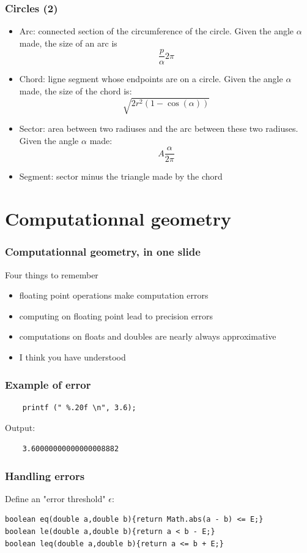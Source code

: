 \documentclass[pdf]{beamer}
\begin{document}
\begin{frame}
	\frametitle{Circles (2)}
	\begin{itemize}
		\item Arc: connected section of the circumference of the circle. Given the angle $\alpha$ made, the size of an arc is
			$$\frac{p}{\alpha}{2\pi}$$
		\item Chord: ligne segment whose endpoints are on a circle. Given the angle $\alpha$ made, the size of the chord is:
		$$\sqrt{2r^2(1-\cos(\alpha))}$$
		\item Sector: area between two radiuses and the arc between these two radiuses. Given the angle $\alpha$ made:
			$$A\frac{\alpha}{2\pi}$$
		\item Segment: sector minus the triangle made by the chord
	\end{itemize}
\end{frame}

\section{Computationnal geometry}
\begin{frame}
	\frametitle{Computationnal geometry, in one slide}
	Four things to remember
	\begin{itemize}
		\pause \item floating point operations make computation errors
		\pause \item computing on floating point lead to precision errors
		\pause \item computations on floats and doubles are nearly always approximative
		\pause \item I think you have understood
	\end{itemize}
\end{frame}

\begin{frame}[fragile]
	\frametitle{Example of error}
	\begin{lstlisting}
	printf (" %.20f \n", 3.6);
	\end{lstlisting}
	Output:
	\begin{lstlisting}
	3.60000000000000008882 
	\end{lstlisting}
\end{frame}

\begin{frame}[fragile]
	\frametitle{Handling errors}
	Define an "error threshold" $\epsilon$:
	\begin{lstlisting}
boolean eq(double a,double b){return Math.abs(a - b) <= E;}
boolean le(double a,double b){return a < b - E;}
boolean leq(double a,double b){return a <= b + E;}
	\end{lstlisting}
\end{frame}
\end{document}
